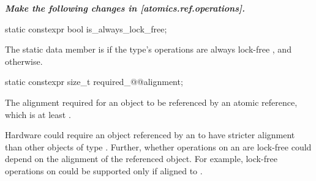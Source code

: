 \textbf{\textit{Make the following changes in [atomics.ref.operations].}} \\

\begin{itemdecl}
static constexpr bool is_always_lock_free;
\end{itemdecl}

\begin{itemdescr}
\pnum
The static data member  is 
if the  type's operations are always lock-free
,
and  otherwise.
\end{itemdescr}

\begin{itemdecl}
static constexpr size_t required_@@alignment;
\end{itemdecl}

\begin{itemdescr}
\pnum
The alignment required for an object to be referenced  by an atomic reference,
which is at least .

\pnum
\begin{note}
Hardware could require an object
referenced by an 
to have stricter alignment
than other objects of type .
Further, whether operations on an 
are lock-free could depend on the alignment of the referenced object.
For example, lock-free operations on 
could be supported only if aligned to .
\end{note}
\end{itemdescr}

